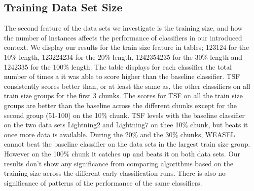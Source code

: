 

\subsection{Training Data Set Size}
The second feature of the data sets we investigate is the training size, and how the number of instances affects the performance of classifiers in our introduced context.
We display our results for the train size feature in tables; 123124 for the 10\% length, 123224234 for the 20\% length, 1242354235 for the 30\% length and 1242335 for the 100\% length.
The table displays for each classifier the total number of times a it was able to score higher than the baseline classifier.
TSF consistently scores better than, or at least the same as, the other classifiers on all train size groups for the first 3 chunks.
The scores for TSF on all the train size groups are better than the baseline across the different chunks except for the second group (51-100) on the 10\% chunk.
TSF levels with the baseline classifier on the two data sets Lightning2 and Lightning7 on thee 10\% chunk, but beats it once more data is available.
During the 20\% and the 30\% chunks, WEASEL cannot beat the baseline classifier on the data sets in the largest train size group.
However on the 100\% chunk it catches up and beats it on both data sets.
Our results don't show any significance from comparing algorithms based on the training size across the different early classification runs.
There is also no significance of patterns of the performance of the same classifiers.


